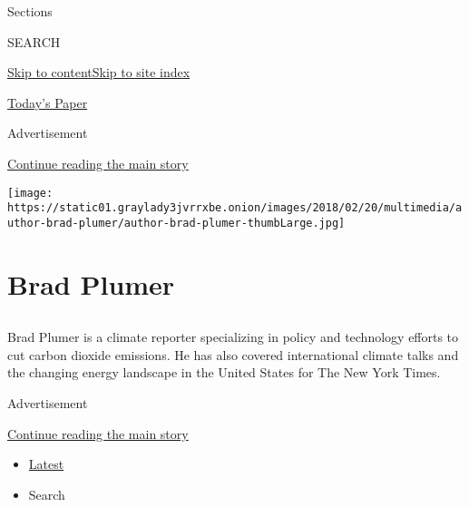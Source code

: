 Sections

SEARCH

\protect\hyperlink{site-content}{Skip to
content}\protect\hyperlink{site-index}{Skip to site index}

\href{https://myaccount.nytimes3xbfgragh.onion/auth/login?response_type=cookie\&client_id=vi}{}

\href{https://www.nytimes3xbfgragh.onion/section/todayspaper}{Today's
Paper}

Advertisement

\protect\hyperlink{after-top}{Continue reading the main story}

\texttt{[image: https://static01.graylady3jvrrxbe.onion/images/2018/02/20/multimedia/author-brad-plumer/author-brad-plumer-thumbLarge.jpg]}

\hypertarget{brad-plumer}{%
\section{Brad Plumer}\label{brad-plumer}}

\subsection{}

Brad Plumer is a climate reporter specializing in policy and technology
efforts to cut carbon dioxide emissions. He has also covered
international climate talks and the changing energy landscape in the
United States for The New York Times.

Advertisement

\protect\hyperlink{after-mid1}{Continue reading the main story}

\begin{itemize}
\tightlist
\item
  \protect\hyperlink{stream-panel}{Latest}
\item
  Search
\end{itemize}

